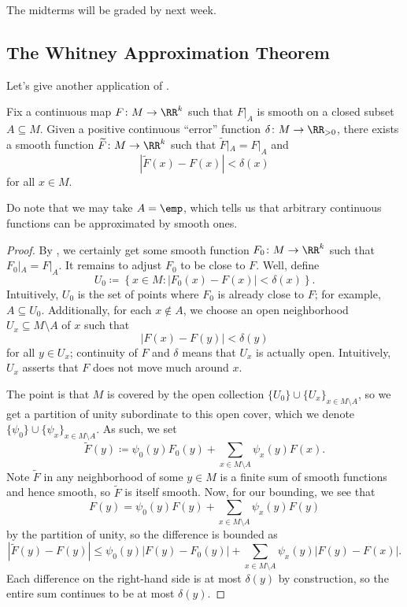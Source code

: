 \documentclass[../notes.tex]{subfiles}
\begin{document}
The midterms will be graded by next week.

\subsection{The Whitney Approximation Theorem}
Let's give another application of .
\begin{proposition} \label{prop:whitney-approx}
	Fix a continuous map $F\colon M\to\RR^k$ such that $F|_A$ is smooth on a closed subset $A\subseteq M$. Given a positive continuous ``error'' function $\delta\colon M\to\RR_{>0}$, there exists a smooth function $\widetilde F\colon M\to\RR^k$ such that $\widetilde F|_A=F|_A$ and
	\[\left|\widetilde F(x)-F(x)\right|<\delta(x)\]
	for all $x\in M$.
\end{proposition}
\begin{remark}
	Do note that we may take $A=\emp$, which tells us that arbitrary continuous functions can be approximated by smooth ones.
\end{remark}
\begin{proof}
	By , we certainly get some smooth function $F_0\colon M\to\RR^k$ such that $F_0|_A=F|_A$. It remains to adjust $F_0$ to be close to $F$. Well, define
	\[U_0\coloneqq\left\{x\in M:\left|F_0(x)-F(x)\right|<\delta(x)\right\}.\]
	Intuitively, $U_0$ is the set of points where $F_0$ is already close to $F$; for example, $A\subseteq U_0$. Additionally, for each $x\notin A$, we choose an open neighborhood $U_x\subseteq M\setminus A$ of $x$ such that
	\[\left|F(x)-F(y)\right|<\delta(y)\]
	for all $y\in U_x$; continuity of $F$ and $\delta$ means that $U_x$ is actually open. Intuitively, $U_x$ asserts that $F$ does not move much around $x$.

	The point is that $M$ is covered by the open collection $\{U_0\}\cup\{U_x\}_{x\in M\setminus A}$, so we get a partition of unity subordinate to this open cover, which we denote $\{\psi_0\}\cup\{\psi_x\}_{x\in M\setminus A}$. As such, we set
	\[\widetilde F(y)\coloneqq\psi_0(y)F_0(y)+\sum_{x\in M\setminus A}\psi_x(y)F(x).\]
	Note $\widetilde F$ in any neighborhood of some $y\in M$ is a finite sum of smooth functions and hence smooth, so $\widetilde F$ is itself smooth. Now, for our bounding, we see that
	\[F(y)=\psi_0(y)F(y)+\sum_{x\in M\setminus A}\psi_x(y)F(y)\]
	by the partition of unity, so the difference is bounded as
	\[\left|\widetilde F(y)-F(y)\right|\le\psi_0(y)\left|F(y)-F_0(y)\right|+\sum_{x\in M\setminus A}\psi_x(y)\left|F(y)-F(x)\right|.\]
	Each difference on the right-hand side is at most $\delta(y)$ by construction, so the entire sum continues to be at most $\delta(y)$.
\end{proof}
\end{document}
